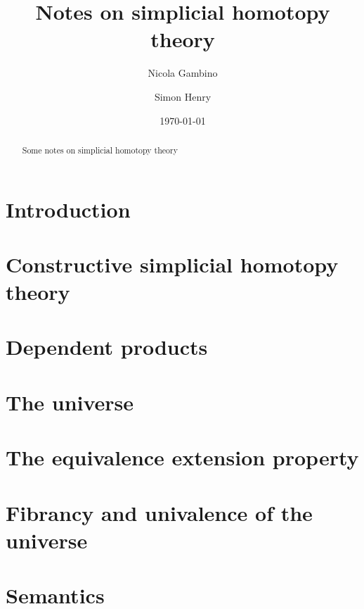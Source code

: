 \documentclass[reqno,10pt,a4paper,oneside,draft]{amsart}
\title[]{Notes on simplicial homotopy theory}
\begin{document}
\begin{abstract}
Some notes on simplicial homotopy theory
\end{abstract}

\author{Nicola Gambino}

\author{Simon Henry}


 \date{\today}

\maketitle

\section{Introduction}

\newpage

\section{Constructive simplicial homotopy theory}

\newpage

\section{Dependent products}

\newpage

\section{The universe}

\newpage

\section{The equivalence extension property}

\newpage

\section{Fibrancy and univalence of the universe}

\newpage

\section{Semantics}
\end{document}

